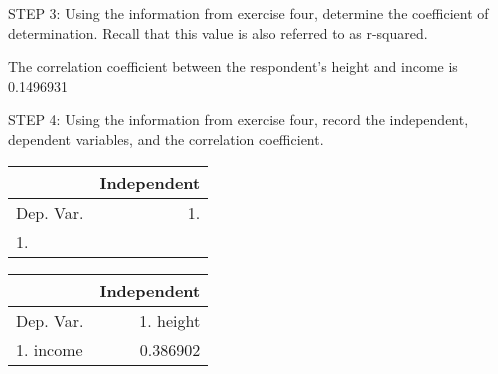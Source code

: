 \documentclass[11pt]{book}\usepackage[]{graphicx}\usepackage[]{color}
\begin{document}
\begin{exercises}
\begin{exercise}
    STEP 3: Using the information from exercise four, determine the coefficient of determination.  Recall that this value is also referred to as r-squared.

    \vspace{5mm}

    \end{exercise}
    \begin{solution}    %

       The correlation coefficient between the respondent's height and income is 0.1496931

    \end{solution}

  \begin{exercise} %

    STEP 4: Using the information from exercise four, record the independent, dependent variables, and the correlation coefficient.

{\scriptsize{
    \begin{table}[ht]
    \centering
    \begin{tabular}{lr} \hline
        &  \multicolumn{1}{c}{Independent} \\ \hline

    Dep. Var. & 1. \underline{\phantom{xxxxxxxx}}      \\ \hline
    1. \underline{\phantom{xxxxxxxx}}  &  \underline{\phantom{xxxxxxxx}}       \\ \hline

    \end{tabular}
    \end{table}
}}


    \end{exercise}
    \begin{solution}    %

       \begin{table}[ht]
    \centering
    \begin{tabular}{lr} \hline
        &  \multicolumn{1}{c}{Independent} \\ \hline

    Dep. Var. & 1. height      \\ \hline
    1. income  &   0.386902      \\ \hline

    \end{tabular}
    \end{table}


\end{solution}
\end{exercises}
\end{document}
